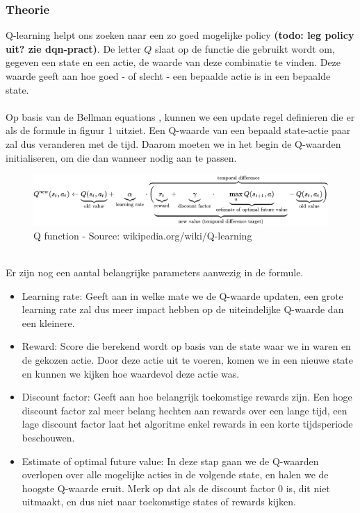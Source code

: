 \documentclass[11pt]{article}
\begin{document}
\subsubsection{Theorie}
Q-learning helpt ons zoeken naar een zo goed mogelijke policy \textbf{(todo: leg policy uit? zie dqn-pract)}. De letter $Q$ slaat op de functie die gebruikt wordt om, gegeven een state en een actie, de waarde van deze combinatie te vinden. Deze waarde geeft aan hoe goed - of slecht - een bepaalde actie is in een bepaalde state.\\\\
Op basis van de Bellman equations \cite{bellman-equations}, kunnen we een update regel definieren die er als de formule in figuur 1 uitziet. Een Q-waarde van een bepaald state-actie paar zal dus veranderen met de tijd. Daarom moeten we in het begin de Q-waarden initialiseren, om die dan wanneer nodig aan te passen.\\
\begin{figure}[h]
\centering
\includegraphics[scale=0.70]{images/qformula.png}
\caption{Q function - Source: wikipedia.org/wiki/Q-learning}
\label{fig:qfunction}
\end{figure} \\
Er zijn nog een aantal belangrijke parameters aanwezig in de formule. 
\begin{itemize}
	\item Learning rate: Geeft aan in welke mate we de Q-waarde updaten, een grote learning rate zal dus meer impact hebben op de uiteindelijke Q-waarde dan een kleinere.
	\item Reward: Score die berekend wordt op basis van de state waar we in waren en de gekozen actie. Door deze actie uit te voeren, komen we in een nieuwe state en kunnen we kijken hoe waardevol deze actie was. 
	\item Discount factor: Geeft aan hoe belangrijk toekomstige rewards zijn. Een hoge discount factor zal meer belang hechten aan rewards over een lange tijd, een lage discount factor laat het algoritme enkel rewards in een korte tijdsperiode beschouwen.
	\item Estimate of optimal future value: In deze stap gaan we de Q-waarden overlopen over alle mogelijke acties in de volgende state, en halen we de hoogste Q-waarde eruit. Merk op dat als de discount factor 0 is, dit niet uitmaakt, en dus niet naar toekomstige states of rewards kijken.
\end{itemize}
\end{document}
